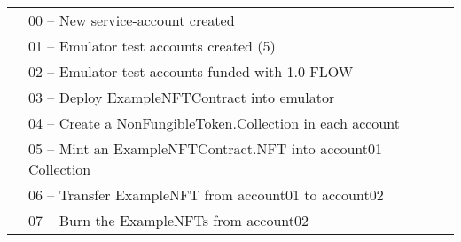 \documentclass[../main.tex]{subfiles}
\begin{document}
\begin{table}[ht]
{\begin{tabular}{lllllll}
            \multicolumn{1}{l|}{}                              & \multicolumn{6}{l|}{00 – New service-account created}                                                                                                                                                                                                                             \\ \cline{2-7}
            \multicolumn{1}{l|}{}                              & \multicolumn{6}{l|}{01 – Emulator test accounts created (5)}                                                                                                                                                                                                                      \\ \cline{2-7}
            \multicolumn{1}{l|}{}                              & \multicolumn{6}{l|}{02 – Emulator test accounts funded with 1.0 FLOW}                                                                                                                                                                                                             \\ \cline{2-7}
            \multicolumn{1}{l|}{}                              & \multicolumn{6}{l|}{03 – Deploy ExampleNFTContract into emulator}                                                                                                                                                                                                                 \\ \cline{2-7}
            \multicolumn{1}{l|}{}                              & \multicolumn{6}{l|}{04 – Create a NonFungibleToken.Collection in each account}                                                                                                                                                                                                    \\ \cline{2-7}
            \multicolumn{1}{l|}{}                              & \multicolumn{6}{l|}{05 – Mint an ExampleNFTContract.NFT into account01 Collection}                                                                                                                                                                                                \\ \cline{2-7}
            \multicolumn{1}{l|}{}                              & \multicolumn{6}{l|}{06 – Transfer ExampleNFT from account01 to account02}                                                                                                                                                                                                         \\ \cline{2-7}
            \multicolumn{1}{l|}{}                              & \multicolumn{6}{l|}{07 – Burn the ExampleNFTs from account02}                                                                                                                                                                                                                     \\ \cline{2-7}
        \end{tabular}%
    }
\end{table}
\end{document}
